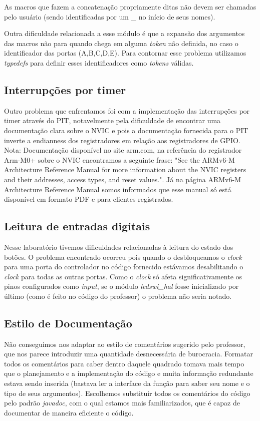 \documentclass{article}
\begin{document}
As macros que fazem a concatenação propriamente ditas não devem ser chamadas pelo usuário (sendo identificadas por um \_ no início de seus nomes).

Outra dificuldade relacionada a esse módulo é que a expansão dos argumentos das macros não para quando chega em alguma \textit{token} não definida, no caso o identificador das portas (A,B,C,D,E). Para contornar esse problema utilizamos \textit{typedefs} para definir esses identificadores como \textit{tokens} válidas.

\subsection{Interrupções por timer}
Outro problema que enfrentamos foi com a implementação das interrupções por timer através do PIT, notavelmente pela dificuldade de encontrar uma documentação clara sobre o NVIC e pois a documentação fornecida para o PIT inverte a endianness dos registradores em relação aos registradores de GPIO.
Nota: Documentação disponível no site arm.com, na referência do registrador Arm-M0+ sobre o NVIC \cite{bb:armnvic} encontramos a seguinte frase: "See the ARMv6-M Architecture Reference Manual for more information about the NVIC registers and their addresses, access types, and reset values.". Já na página ARMv6-M Architecture Reference Manual \cite{bb:armarm} somos informados que esse manual só está disponível em formato PDF e para clientes registrados.

\subsection{Leitura de entradas digitais}
Nesse laboratório tivemos dificuldades relacionadas à leitura do estado dos botões. O problema encontrado ocorreu pois quando o desbloqueamos o \textit{clock} para uma porta do controlador no código fornecido estávamos desabilitando o \textit{clock} para todas as outras portas. Como o \textit{clock} só afeta significativamente os pinos configurados como \textit{input}, se o módulo \textit{ledswi\_hal} fosse inicializado por último (como é feito no código do professor) o problema não seria notado.

\subsection{Estilo de Documentação}
Não conseguimos nos adaptar ao estilo de comentários sugerido pelo professor, que nos parece introduzir uma quantidade desnecessária de burocracia. Formatar todos os comentários para caber dentro daquele quadrado tomava mais tempo que o planejamento e a implementação do código e muita informação redundante estava sendo inserida (bastava ler a interface da função para saber seu nome e o tipo de seus argumentos). Escolhemos substituir todos os comentários do código pelo padrão \textit{javadoc}, com o qual estamos mais familiarizados, que é capaz de documentar de maneira eficiente o código.
\end{document}
